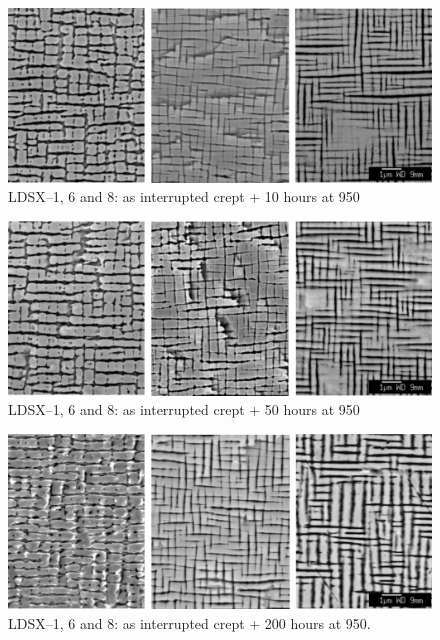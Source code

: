 %
\begin{figure}[hp]
\begin{center}
\includegraphics{LDSXInterrupted_10}
\caption{LDSX--1, 6 and 8: as interrupted crept + 10 hours at 950\celsius}\label{fig:LDSXInterrupted_10}
\end{center}
\end{figure} 
%
\begin{figure}[hp]
\begin{center}
\includegraphics{LDSXInterrupted_50}
\caption{LDSX--1, 6 and 8: as interrupted crept + 50 hours at 950\celsius}\label{fig:LDSXInterrupted_50}
\end{center}
\end{figure} 
%
\begin{figure}[hp]
\begin{center}
\includegraphics{LDSXInterrupted_200}
\caption{LDSX--1, 6 and 8: as interrupted crept + 200 hours at 950\celsius. }\label{fig:LDSXInterrupted_200}
\end{center}
\end{figure} 
